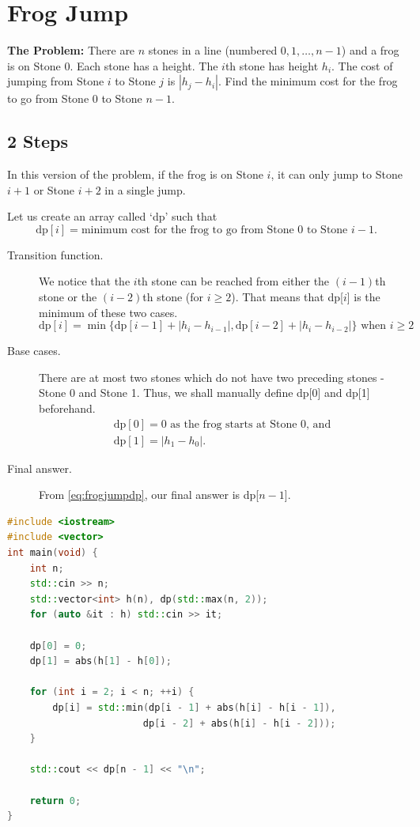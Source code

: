 \documentclass[12pt, a4paper]{article}
\theoremstyle{definition}
\theoremstyle{remark}
\begin{document}
\section{Frog Jump}
\begin{tcolorbox}
    \textbf{The Problem:} There are $n$ stones in a line (numbered $0, 1,\ldots,n-1$) and a frog is on Stone 0. Each stone has a height. The $i$th stone has height $h_i$. The cost of jumping from Stone $i$ to Stone $j$ is $|h_j - h_i|$. Find the minimum cost for the frog to go from Stone 0 to Stone $n-1$.
\end{tcolorbox}

\subsection{2 Steps} \label{sec:frog2steps}
In this version of the problem, if the frog is on Stone $i$, it can only jump to Stone $i+1$ or Stone $i+2$ in a single jump.

Let us create an array called `dp' such that
\begin{equation} \label{eq:frogjumpdp}
    \text{dp}[i] = \text{minimum cost for the frog to go from Stone $0$ to Stone $i-1$}.
\end{equation}

\begin{description}
    \item[Transition function.] We notice that the $i$th stone can be reached from either the $(i-1)$th stone or the $(i-2)$th stone (for $i \geq 2$). That means that dp[$i$] is the minimum of these two cases.
        \begin{equation}
            \text{dp}[i] = \min\{\text{dp}[i-1] + |h_i - h_{i-1}|, \text{dp}[i-2] + |h_i - h_{i-2}|\} \text{ when } i \geq 2
        \end{equation}
    \item[Base cases.] There are at most two stones which do not have two preceding stones - Stone 0 and Stone 1. Thus, we shall manually define dp[0] and dp[1] beforehand.
        \begin{gather}
            \text{dp}[0] = 0 \text{ as the frog starts at Stone 0, and} \\
            \text{dp}[1] = |h_1 - h_0|.
        \end{gather}
    \item[Final answer.] From \cref{eq:frogjumpdp}, our final answer is dp[$n-1$].
\end{description}
\begin{lstlisting}[language=C++]
#include <iostream>
#include <vector>
int main(void) {
    int n;
    std::cin >> n;
    std::vector<int> h(n), dp(std::max(n, 2));
    for (auto &it : h) std::cin >> it;

    dp[0] = 0;
    dp[1] = abs(h[1] - h[0]);

    for (int i = 2; i < n; ++i) {
        dp[i] = std::min(dp[i - 1] + abs(h[i] - h[i - 1]),
                        dp[i - 2] + abs(h[i] - h[i - 2]));
    }

    std::cout << dp[n - 1] << "\n";

    return 0;
}
\end{lstlisting}
\end{document}
